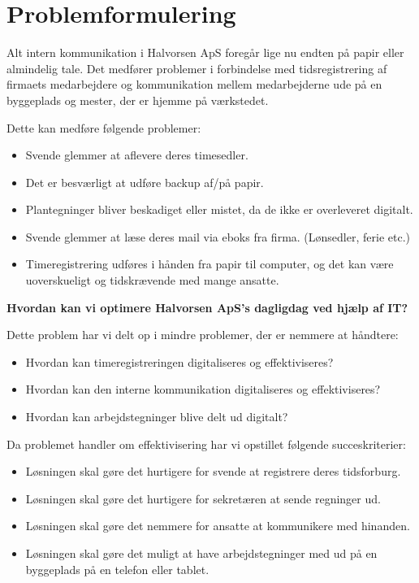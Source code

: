 \section{Problemformulering} \label{problemformulering}

Alt intern kommunikation i Halvorsen ApS foregår lige nu endten på papir eller almindelig tale. Det medfører problemer i forbindelse med tidsregistrering af firmaets medarbejdere og kommunikation mellem medarbejderne ude på en byggeplads og mester, der er hjemme på værkstedet.

Dette kan medføre følgende problemer:
\begin{itemize}
    \item Svende glemmer at aflevere deres timesedler.
    \item Det er besværligt at udføre backup af/på papir.
    \item Plantegninger bliver beskadiget eller mistet, da de ikke er overleveret digitalt.
    \item Svende glemmer at læse deres mail via eboks fra firma. (Lønsedler, ferie etc.)
    \item Timeregistrering udføres i hånden fra papir til computer, og det kan være uoverskueligt og tidskrævende med mange ansatte.
\end{itemize}

\textbf{Hvordan kan vi optimere Halvorsen ApS's dagligdag ved hjælp af IT?}

Dette problem har vi delt op i mindre problemer, der er nemmere at håndtere:
\begin{itemize}
    \item Hvordan kan timeregistreringen digitaliseres og effektiviseres?
    \item Hvordan kan den interne kommunikation digitaliseres og effektiviseres?
    \item Hvordan kan arbejdstegninger blive delt ud digitalt?
\end{itemize}

Da problemet handler om effektivisering har vi opstillet følgende succeskriterier:

\begin{itemize}
    \item Løsningen skal gøre det hurtigere for svende at registrere deres tidsforburg.
    \item Løsningen skal gøre det hurtigere for sekretæren at sende regninger ud.
    \item Løsningen skal gøre det nemmere for ansatte at kommunikere med hinanden.
    \item Løsningen skal gøre det muligt at have arbejdstegninger med ud på en byggeplads på en telefon eller tablet.
\end{itemize}